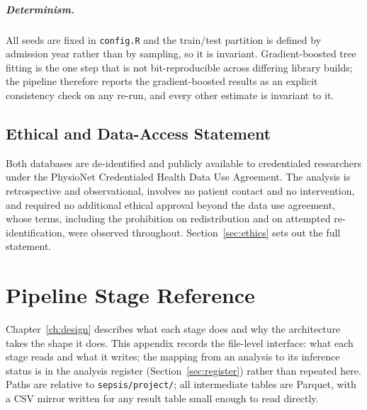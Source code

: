 \paragraph{Determinism.} All seeds are fixed in \texttt{config.R} and the
train/test partition is defined by admission year rather than by sampling, so
it is invariant. Gradient-boosted tree fitting is the one step that is not
bit-reproducible across differing library builds; the pipeline therefore
reports the gradient-boosted results as an explicit consistency check on any
re-run, and every other estimate is invariant to it.

\section{Ethical and Data-Access Statement}

Both databases are de-identified and publicly available to credentialed
researchers under the PhysioNet Credentialed Health Data Use Agreement. The
analysis is retrospective and observational, involves no patient contact and no
intervention, and required no additional ethical approval beyond the data use
agreement, whose terms, including the prohibition on redistribution and on
attempted re-identification, were observed throughout.
Section~\ref{sec:ethics} sets out the full statement.


\chapter{Pipeline Stage Reference}
\label{app:stages}

Chapter~\ref{ch:design} describes what each stage does and why the architecture
takes the shape it does. This appendix records the file-level interface: what
each stage reads and what it writes; the mapping from an analysis to its
inference status is in the analysis register (Section~\ref{sec:register})
rather than repeated here. Paths are relative to \texttt{sepsis/project/}; all intermediate tables
are Parquet, with a CSV mirror written for any result table small enough to read
directly.

